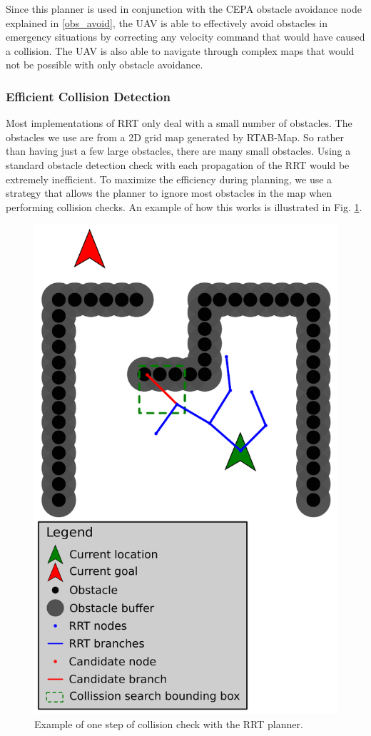 \documentclass[letterpaper, 10 pt, conference]{ieeeconf}  %
\begin{document}
Since this planner is used in conjunction with the CEPA obstacle avoidance node explained in \ref{obs_avoid}, the UAV is able to effectively avoid obstacles in emergency situations by correcting any velocity command that would have caused a collision. The UAV is also able to navigate through complex maps that would not be possible with only obstacle avoidance.

\subsubsection{Efficient Collision Detection}
Most implementations of RRT only deal with a small number of obstacles. The obstacles we use are from a 2D grid map generated by RTAB-Map. So rather than having just a few large obstacles, there are many small obstacles. Using a standard obstacle detection check with each propagation of the RRT would be extremely inefficient. To maximize the efficiency during planning, we use a strategy that allows the planner to ignore most obstacles in the map when performing collision checks. An example of how this works is illustrated in Fig. \ref{fig:rrt_sample}.

\begin{figure}
\centering
\includegraphics[width=0.8\linewidth]{rrt_sample}
\caption{Example of one step of collision check with the RRT planner.}
\label{fig:rrt_sample}
\end{figure}
\end{document}
